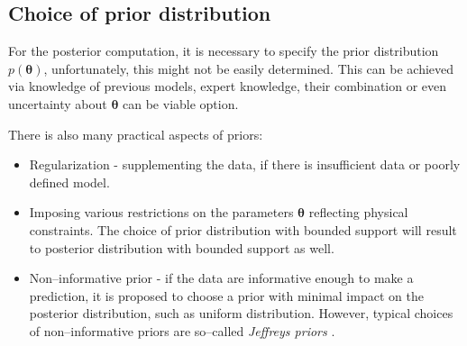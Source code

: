 \subsection{Choice of prior distribution}
For the posterior computation, it is necessary to specify the prior distribution $p(\boldsymbol{\theta})$, unfortunately, this might not be easily determined. This can be achieved via knowledge of previous models, expert knowledge, their combination or even uncertainty about $\boldsymbol{\theta}$ can be viable option. 

There is also many practical aspects of priors:
\begin{itemize}
	\item Regularization - supplementing the data, if there is insufficient data or poorly defined model. 
	\item Imposing various restrictions on the parameters $\boldsymbol{\theta}$ reflecting physical constraints. The choice of prior distribution with bounded support will result to posterior distribution with bounded support as well. 
	\item Non--informative prior - if the data are informative enough to make a prediction, it is proposed to choose a prior with minimal impact on the posterior distribution, such as uniform distribution. However, typical choices of non--informative priors are so--called \emph{Jeffreys priors} \cite{jeffrey}.
\end{itemize}



